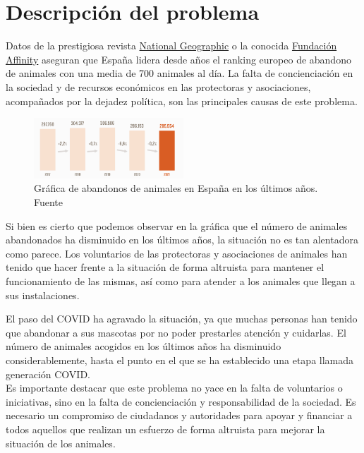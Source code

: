 \section{Descripción del problema}\label{sec:descripcion-del-problema}

Datos de la prestigiosa revista \href{https://www.nationalgeographic.es/animales/2021/12/espana-lider-europea-en-abandono-de-animales-700-cada-dia}{National Geographic} o
la conocida \href{https://www.fundacion-affinity.org}{Fundación Affinity} aseguran que España lidera desde años el
ranking europeo de abandono de animales con una media de 700 animales al día. La falta de concienciación en la sociedad y
de recursos económicos en las protectoras y asociaciones, acompañados por la dejadez política, son las principales causas de este problema. \\

\begin{figure}[H]
\centering
\includegraphics[width=0.5\textwidth]{imgs/grafica_abandonos.png}
    \caption{Gráfica de abandonos de animales en España en los últimos años. Fuente~\cite{affinity}}
    \label{fig:grafica_abandonos}
\end{figure}

Si bien es cierto que podemos observar en la gráfica que el número de animales abandonados ha disminuido en los últimos años, la situación no es tan
alentadora como parece. Los voluntarios de las protectoras y asociaciones de animales han tenido que hacer frente a la
situación de forma altruista para mantener el funcionamiento de las mismas, así como para atender a los animales que
llegan a sus instalaciones.

El paso del COVID ha agravado la situación, ya que muchas personas han tenido que abandonar a sus mascotas por no poder
prestarles atención y cuidarlas. El número de animales acogidos en los últimos años ha disminuido considerablemente, hasta el punto en el que
se ha establecido una etapa llamada generación COVID. \\

Es importante destacar que este problema no yace en la falta de voluntarios o iniciativas, sino en la falta de
concienciación y responsabilidad de la sociedad. Es necesario un compromiso de ciudadanos y autoridades para
apoyar y financiar a todos aquellos que realizan un esfuerzo de forma altruista para mejorar la situación de los
animales. \\

